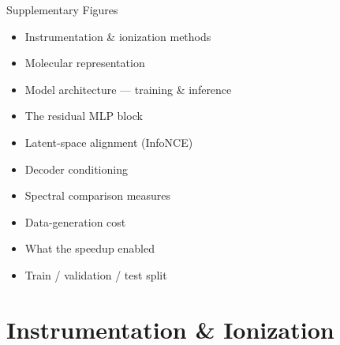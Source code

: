 %
%

\recordmainframetotal          %
\appendix
\setcounter{framenumber}{0}    %
\supplementarytrue

\newcommand{\suppfig}[2][0.72\textheight]{%
    \begin{adjustbox}{max totalsize={\textwidth}{#1},center}
        \reportmetrics%
    \end{adjustbox}%
}


\begin{frame}{Supplementary Figures}
    \begin{itemize}
        \item Instrumentation \& ionization methods
        \item Molecular representation
        \item Model architecture --- training \& inference
        \item The residual MLP block
        \item Latent-space alignment (InfoNCE)
        \item Decoder conditioning
        \item Spectral comparison measures
        \item Data-generation cost
        \item What the speedup enabled
        \item Train / validation / test split
    \end{itemize}
\end{frame}

\section[Ionization]{Instrumentation \& Ionization}

